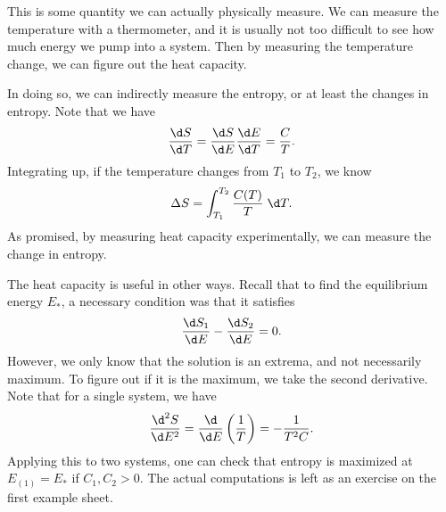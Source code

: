 \documentclass[a4paper]{article}
\begin{document}
This is some quantity we can actually physically measure. We can measure the temperature with a thermometer, and it is usually not too difficult to see how much energy we pump into a system. Then by measuring the temperature change, we can figure out the heat capacity.

In doing so, we can indirectly measure the entropy, or at least the changes in entropy. Note that we have
\[
  \frac{\d S}{\d T} = \frac{\d S}{\d E} \frac{\d E}{\d T} = \frac{C}{T}.
\]
Integrating up, if the temperature changes from $T_1$ to $T_2$, we know
\[
  \Delta S = \int_{T_1}^{T_2} \frac{C(T)}{T}\;\d T.
\]
As promised, by measuring heat capacity experimentally, we can measure the change in entropy.

The heat capacity is useful in other ways. Recall that to find the equilibrium energy $E_*$, a necessary condition was that it satisfies
\[
  \frac{\d S_1}{\d E} - \frac{\d S_2}{\d E} = 0.
\]
However, we only know that the solution is an extrema, and not necessarily maximum. To figure out if it is the maximum, we take the second derivative. Note that for a single system, we have
\[
  \frac{\d^2 S}{\d E^2} = \frac{\d}{\d E} \left(\frac{1}{T}\right) = -\frac{1}{T^2 C}.
\]
Applying this to two systems, one can check that entropy is maximized at $E_{(1)} = E_*$ if $C_1, C_2 > 0$. The actual computations is left as an exercise on the first example sheet.
\end{document}
